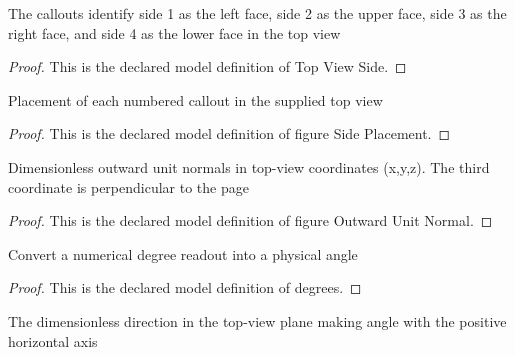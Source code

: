 \begin{definition}
  \label{def:physics:phyx-mini-0850:phyxminiproblems-problemphyxmini0850-topviewside}
  The callouts identify side 1 as the left face, side 2 as the upper face, side 3 as the right face, and side 4 as the lower face in the top view
\end{definition}
\begin{proof}
  This is the declared model definition of Top View Side.
\end{proof}
\begin{definition}
  \label{def:physics:phyx-mini-0850:phyxminiproblems-problemphyxmini0850-figuresideplacement}
  Placement of each numbered callout in the supplied top view
\end{definition}
\begin{proof}
  This is the declared model definition of figure Side Placement.
\end{proof}
\begin{definition}
  \label{def:physics:phyx-mini-0850:phyxminiproblems-problemphyxmini0850-figureoutwardunitnormal}
  Dimensionless outward unit normals in top-view coordinates (x,y,z). The third coordinate is perpendicular to the page
\end{definition}
\begin{proof}
  This is the declared model definition of figure Outward Unit Normal.
\end{proof}
\begin{definition}[degrees]
  \label{def:physics:phyx-mini-0850:phyxminiproblems-problemphyxmini0850-degrees}
  Convert a numerical degree readout into a physical angle
\end{definition}
\begin{proof}
  This is the declared model definition of degrees.
\end{proof}
\begin{definition}
  \label{def:physics:phyx-mini-0850:phyxminiproblems-problemphyxmini0850-topviewdirection}
  The dimensionless direction in the top-view plane making angle with the positive horizontal axis
\end{definition}
